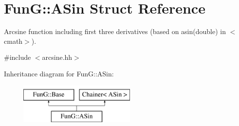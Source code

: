 \hypertarget{structFunG_1_1ASin}{\section{Fun\-G\-:\-:A\-Sin Struct Reference}
\label{structFunG_1_1ASin}
}


Arcsine function including first three derivatives (based on asin(double) in $<$cmath$>$).  




{\ttfamily \#include $<$arcsine.\-hh$>$}

Inheritance diagram for Fun\-G\-:\-:A\-Sin\-:\begin{figure}[H]
\begin{center}
\leavevmode
\includegraphics[height=2.000000cm]{structFunG_1_1ASin}
\end{center}
\end{figure}
